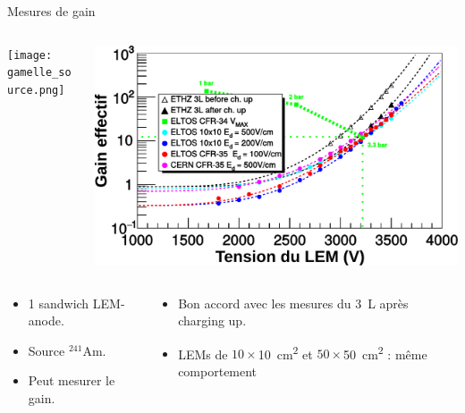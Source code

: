     \begin{frame}{Mesures de gain}
    	\begin{scriptsize}
    		\begin{columns}
    			\begin{column}{0.46\textwidth}
    				\centering \texttt{[image: gamelle\_source.png]}
    			\end{column}\hfill
    			\begin{column}{0.58\textwidth}
    				\centering \includegraphics[width=\textwidth]{./pictures/New_LEM_Gain.pdf}
    			\end{column}
    		\end{columns}\vfill
    		\begin{columns}
    			\begin{column}{0.38\textwidth}
    				\begin{itemize}
    					\item 1 sandwich LEM-anode.
    					\item Source $^{241}$Am.
    					\item Peut mesurer le gain.
    				\end{itemize}
    			\end{column}\hfill
    			\begin{column}{0.58\textwidth}
    				\begin{itemize}
        				\item Bon accord avec les mesures du \SI{3}{\liter} après charging up.
    					\item LEMs de $10\times$\SI{10}{\centi\meter\squared} et $50\times$\SI{50}{\centi\meter\squared} : même comportement

\end{itemize}
\end{column}
\end{columns}
\end{scriptsize}
\end{frame}
